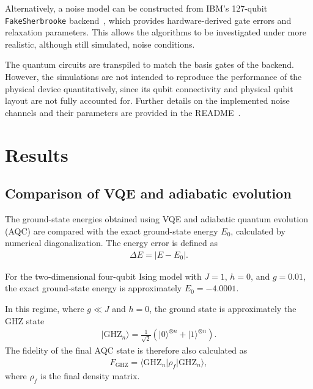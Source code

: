 \documentclass[aps,prl,reprint,amsmath,amssymb,twocolumn,preprintnumbers,superscriptaddress,10pt]{revtex4-2}
\renewcommand{\bra}[1]{\big\langle #1 \big|}
\renewcommand{\ket}[1]{\big| #1 \big\rangle}
\begin{document}

Alternatively, a noise model can be constructed from IBM's 127-qubit \texttt{FakeSherbrooke} backend~\cite{fakesherbrooke}, which provides hardware-derived gate errors and relaxation parameters. This allows the algorithms to be investigated under more realistic, although still simulated, noise conditions.


The quantum circuits are transpiled to match the basis gates of the backend. 
However, the simulations are not intended to reproduce the performance of the physical device quantitatively, since its qubit connectivity and physical qubit layout are not fully accounted for. 
Further details on the implemented noise channels and their parameters are provided in the README~\cite{code}.



\section{Results}

\subsection{Comparison of VQE and adiabatic evolution}

The ground-state energies obtained using VQE and adiabatic quantum evolution (AQC) are compared with the exact ground-state energy $E_0$, calculated by numerical diagonalization. 
The energy error is defined as
\begin{align}
    \Delta E = |E-E_0|.
\end{align}

For the two-dimensional four-qubit Ising model with
$J=1$, $h=0$, and $g=0.01$, the exact ground-state
energy is approximately $E_0=-4.0001$.

In this regime, where $g\ll J$ and $h=0$, the ground state is approximately the GHZ state
\begin{align}
    \ket{\mathrm{GHZ}_n}
    =\frac{1}{\sqrt{2}}
    \left(\ket{0}^{\otimes n}
    +\ket{1}^{\otimes n}\right).
\end{align}
The fidelity of the final AQC state is therefore also calculated as
\begin{align}
    F_{\mathrm{GHZ}}
    =\bra{\mathrm{GHZ}_n}
    \rho_f
    \ket{\mathrm{GHZ}_n},
\end{align}
where $\rho_f$ is the final density matrix.
\end{document}

